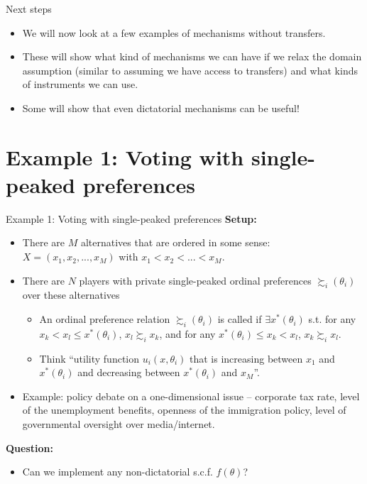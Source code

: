 \documentclass[english,10pt
,aspectratio=169
]{beamer}
\begin{document}
\begin{frame}{Next steps}
	\begin{itemize}
		\item We will now look at a few examples of mechanisms without transfers. 
		\item These will show what kind of mechanisms we can have if we relax the domain assumption (similar to assuming we have access to transfers) and what kinds of instruments we can use.
		\item Some will show that even dictatorial mechanisms can be useful!
	\end{itemize}
\end{frame}



\section{Example 1: Voting with single-peaked preferences}

\begin{frame}{Example 1: Voting with single-peaked preferences}
	\textbf{Setup:}
	\begin{itemize}
		\item There are $M$ alternatives that are ordered in some sense: \\
		$X = (x_1, x_2, ..., x_M)$ with $x_1 < x_2 < ... < x_M$.
		\item There are $N$ players with private single-peaked ordinal preferences $\succsim_i(\theta_i)$ over these alternatives
		\begin{itemize}
			\item An ordinal preference relation $\succsim_i(\theta_i)$ is called  if $\exists x^*(\theta_i)$ s.t. for any $x_k < x_l\leq x^*(\theta_i)$, $x_l \succsim_i x_k$, and for any $x^*(\theta_i) \leq x_k < x_l$, $x_k \succsim_i x_l$.
			\item Think ``utility function $u_i(x,\theta_i)$ that is increasing between $x_1$ and $x^*(\theta_i)$ and decreasing between $x^*(\theta_i)$ and $x_M$''.
		\end{itemize}
		\item \alert{Example}: policy debate on a one-dimensional issue -- corporate tax rate, level of the unemployment benefits, openness of the immigration policy, level of governmental oversight over media/internet.
	\end{itemize}
	\textbf{Question:}
	\begin{itemize}
		\item Can we implement any non-dictatorial s.c.f. $f(\theta)$?
	\end{itemize}
\end{frame}
\end{document}
